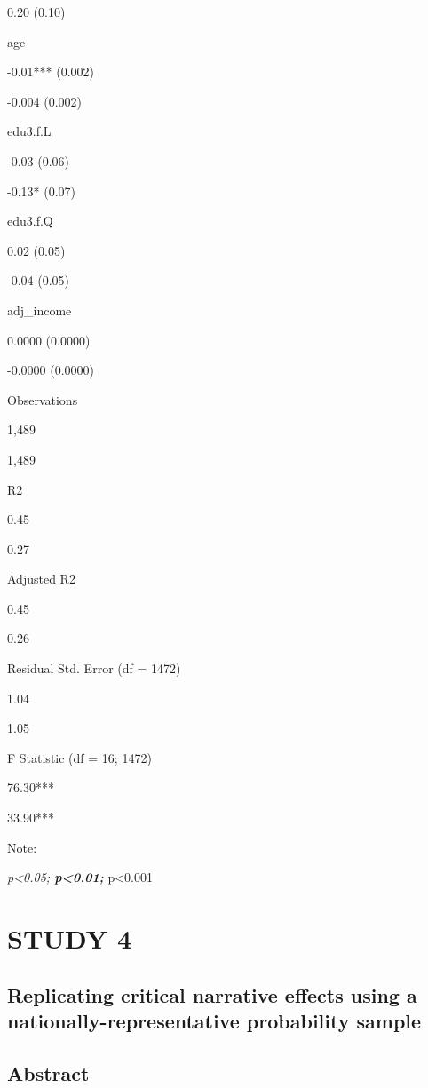 \documentclass[
]{book}
\begin{document}
0.20 (0.10)

age

-0.01*** (0.002)

-0.004 (0.002)

edu3.f.L

-0.03 (0.06)

-0.13* (0.07)

edu3.f.Q

0.02 (0.05)

-0.04 (0.05)

adj\_income

0.0000 (0.0000)

-0.0000 (0.0000)

Observations

1,489

1,489

R2

0.45

0.27

Adjusted R2

0.45

0.26

Residual Std. Error (df = 1472)

1.04

1.05

F Statistic (df = 16; 1472)

76.30***

33.90***

Note:

\emph{p\textless0.05; \textbf{p\textless0.01; }}p\textless0.001

\hypertarget{study-4}{%
\chapter{STUDY 4}\label{study-4}}

\hypertarget{replicating-critical-narrative-effects-using-a-nationally-representative-probability-sample}{%
\section*{Replicating critical narrative effects using a nationally-representative probability sample}\label{replicating-critical-narrative-effects-using-a-nationally-representative-probability-sample}}

\hypertarget{abstract-2}{%
\section*{Abstract}\label{abstract-2}}
\end{document}
